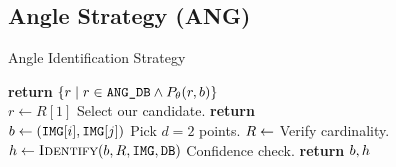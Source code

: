 
\subsection{Angle Strategy (ANG)}\label{subsec:angleMethod}
\newcommand{\invalidBijection}{\If{$\solutionmap$ is valid}}
\begin{algorithm}
    \caption{Angle Identification Strategy} \label{algorithm:angleIdentification}
    \begin{algorithmic}[1]
    	\State \textbf{return} $\{ r \mid r \in \texttt{ANG\_DB} \land P_\theta(r, b) \}$
    	\EndFunction
        \\
        \State $r \gets R[1]$ \Comment Select our candidate.
        \State \textbf{return} 
        \EndFunction
        \\
         \label{algline:angleI}
         \label{algline:angleJ}
        \State $b \gets \left(\texttt{IMG}[i], \texttt{IMG}[j]\right)$ \Comment Pick $d=2$ points. 
        \State $R \gets $ 
         \Comment Verify cardinality.
        \State $h \gets \Call{Identify}{b, R, \imageset, \databaseset}$
        \invalidBijection \Comment Confidence check.
        \State \textbf{return} $b, h$
        \EndIf
        \EndIf
        \EndFor
        \EndFor
        \EndProcedure
    \end{algorithmic}
\end{algorithm}


